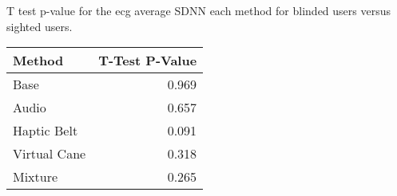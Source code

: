 
\centering
\caption{T test p-value for the ecg average SDNN each method for blinded users versus sighted users.}
\label{tab:ttest_ecg_sdnn}
\begin{tabular}{lr}
\toprule
      Method &  T-Test P-Value \\
\midrule
        Base &           0.969 \\
       Audio &           0.657 \\
 Haptic Belt &           0.091 \\
Virtual Cane &           0.318 \\
     Mixture &           0.265 \\
\bottomrule
\end{tabular}
